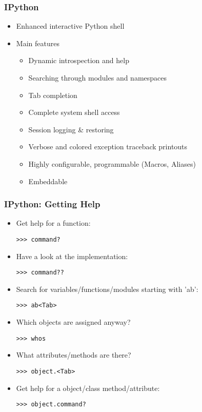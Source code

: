 \begin{frame}[fragile]
    \frametitle{IPython}
    \begin{itemize}
        \item Enhanced interactive Python shell
        \item Main features
        \begin{itemize}
            \item Dynamic introspection and help
            \item Searching through modules and namespaces
            \item Tab completion
            \item Complete system shell access
            \item Session logging \& restoring
            \item Verbose and colored exception traceback printouts
            \item Highly configurable, programmable (Macros, Aliases)
            \item Embeddable
        \end{itemize}
    \end{itemize}
\end{frame}

\begin{frame}[fragile]
    \frametitle{IPython: Getting Help}
    \begin{itemize}
    \item Get help for a function:
    \begin{myColorBox}{0.9}{} \verb#>>> command?#\end{myColorBox}
    \item Have a look at the implementation:
    \begin{myColorBox}{0.9}{} \verb#>>> command??#\end{myColorBox}
    \item Search for variables/functions/modules starting with 'ab':
    \begin{myColorBox}{0.9}{} \verb#>>> ab<Tab>#\end{myColorBox}
    \item Which objects are assigned anyway? 
    \begin{myColorBox}{0.9}{} \verb#>>> whos#\end{myColorBox}
    \item What attributes/methods are there? 
    \begin{myColorBox}{0.9}{}\verb#>>> object.<Tab>#\end{myColorBox}
    \item Get help for a object/class method/attribute:
    \begin{myColorBox}{0.9}{} \verb#>>> object.command?#\end{myColorBox}
    \end{itemize}
\end{frame}

